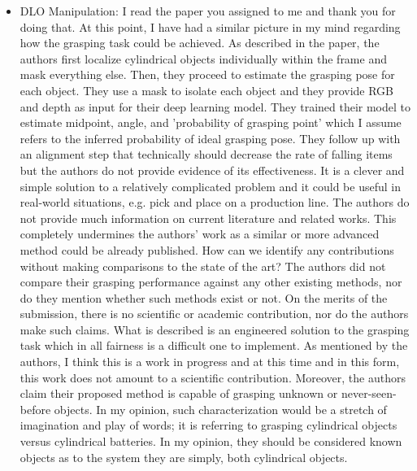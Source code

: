 \documentclass[11pt]{article}
\begin{document}
\begin{itemize}
    \item DLO Manipulation: I read the paper you assigned to me and thank you
    for doing that. At this point, I have had a similar picture in my mind
    regarding how the grasping task could be achieved. As described in the paper,
     the authors first localize cylindrical objects individually within the frame
      and mask everything else. Then, they proceed to estimate the grasping pose
       for each object. They use a mask to isolate each object and they provide RGB and depth as input for their deep learning model. They trained their model to estimate midpoint, angle, and 'probability of grasping point' which I assume refers to the inferred probability of ideal grasping pose. They follow up with an alignment step that technically should decrease the rate of falling items but the authors do not provide evidence of its effectiveness. It is a clever and simple solution to a relatively complicated problem and
    it could be useful in real-world situations, e.g. pick and place on a production line.
    The authors do not provide much information on current literature and related works. This completely undermines the authors' work as a similar or more advanced method could be already published. How can we identify any contributions without making comparisons to the state of the art? The authors did not compare their grasping performance against any other existing methods, nor do they mention whether such methods exist or not. On the merits of the submission, there is no scientific or academic contribution, nor do the authors make such claims. What is described is an engineered solution to the grasping task which in all fairness is a difficult one to implement. As mentioned by the authors, I think this is a work in progress and at this time and in this form, this work does not amount to a scientific contribution. Moreover, the authors claim their proposed method is capable of grasping unknown or never-seen-before objects. In my opinion, such characterization would be a stretch of imagination and play of words; it is referring to grasping cylindrical objects versus cylindrical batteries. In my opinion, they should be considered known objects as to the system they are simply, both cylindrical objects.


\end{itemize}
\end{document}
